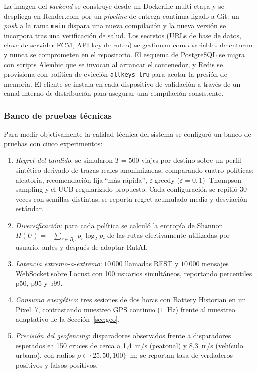 \documentclass[a4paper,fleqn]{cas-sc}
\newcommand{\RUTAI}{RutAI\xspace}
\newcommand{\UCB}{UCB\xspace}
\begin{document}
	La imagen del \emph{backend} se construye desde un Dockerfile multi-etapa y se despliega en Render.com por un \emph{pipeline} de entrega continua ligado a Git: un \emph{push} a la rama \texttt{main} dispara una nueva compilaci\'on y la nueva versi\'on se incorpora tras una verificaci\'on de salud. Los secretos (URLs de base de datos, clave de servidor FCM, API key de ruteo) se gestionan como variables de entorno y nunca se comprometen en el repositorio. El esquema de PostgreSQL se migra con scripts Alembic que se invocan al arrancar el contenedor, y Redis se provisiona con pol\'itica de evicci\'on \texttt{allkeys-lru} para acotar la presi\'on de memoria. El cliente se instala en cada dispositivo de validaci\'on a trav\'es de un canal interno de distribuci\'on para asegurar una compilaci\'on consistente.
	
	\subsubsection{Banco de pruebas t\'ecnicas}\label{sec:bench}
	
	Para medir objetivamente la calidad t\'ecnica del sistema se configur\'o un banco de pruebas con cinco experimentos:
	
	\begin{enumerate}
		\item \emph{Regret del bandido}: se simularon $T=500$ viajes por destino sobre un perfil sint\'etico derivado de trazas reales anonimizadas, comparando cuatro pol\'iticas: aleatoria, recomendaci\'on fija ``m\'as r\'apida'', $\varepsilon$-greedy ($\varepsilon=0{,}1$), Thompson sampling \citep{chapelle2011thompson} y el \UCB regularizado propuesto. Cada configuraci\'on se repiti\'o 30 veces con semillas distintas; se reporta regret acumulado medio y desviaci\'on est\'andar.
		\item \emph{Diversificaci\'on}: para cada pol\'itica se calcul\'o la entrop\'ia de Shannon $H(U) = -\sum_{r\in R_U} p_r \log_2 p_r$ \citep{shannon1948entropy} de las rutas efectivamente utilizadas por usuario, antes y despu\'es de adoptar \RUTAI.
		\item \emph{Latencia extremo-a-extremo}: $10\,000$ llamadas REST y $10\,000$ mensajes WebSocket sobre Locust con 100 usuarios simult\'aneos, reportando percentiles p50, p95 y p99.
		\item \emph{Consumo energ\'etico}: tres sesiones de dos horas con Battery Historian en un Pixel~7, contrastando muestreo GPS continuo ($1$~Hz) frente al muestreo adaptativo de la Secci\'on~\ref{sec:geo}.
		\item \emph{Precisi\'on del geofencing}: disparadores observados frente a disparadores esperados en 150 cruces de cerca a 1{,}4~m/s (peatonal) y 8{,}3~m/s (veh\'iculo urbano), con radios $\rho \in \{25,50,100\}$~m; se reportan tasa de verdaderos positivos y falsos positivos.
	\end{enumerate}
	
\end{document}
